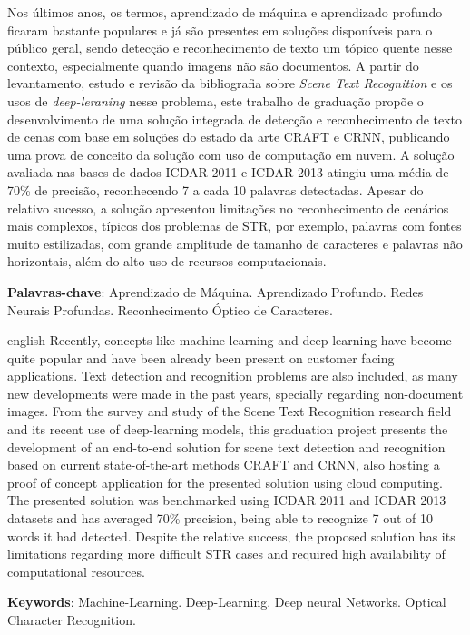 
\setlength{\absparsep}{18pt} %
\begin{resumo}
Nos últimos anos, os termos, aprendizado de máquina e aprendizado profundo ficaram bastante populares e já são 
presentes em soluções disponíveis para o público geral, sendo detecção e reconhecimento de texto um tópico 
quente nesse contexto, especialmente quando imagens não são documentos.
A partir do levantamento, estudo e revisão da bibliografia sobre \textit{Scene Text Recognition} e os usos de 
\textit{deep-leraning} nesse problema, este trabalho de graduação propõe o desenvolvimento de uma solução 
integrada de detecção e reconhecimento de texto de cenas com base em soluções do estado da arte CRAFT e CRNN, 
publicando uma prova de conceito da solução com uso de computação em nuvem.
A solução avaliada nas bases de dados ICDAR 2011 e ICDAR 2013 atingiu uma média de 70\% de precisão, reconhecendo 
7 a cada 10 palavras detectadas. Apesar do relativo sucesso, a solução apresentou limitações no reconhecimento de 
cenários mais complexos, típicos dos problemas de STR, por exemplo, palavras com fontes muito estilizadas, com grande 
amplitude de tamanho de caracteres e palavras não horizontais, além do alto uso de recursos computacionais.

 \textbf{Palavras-chave}: Aprendizado de Máquina. Aprendizado Profundo. Redes Neurais Profundas. Reconhecimento Óptico de Caracteres.
\end{resumo}

\begin{resumo}[Abstract]
 \begin{otherlanguage*}{english}
   Recently, concepts like machine-learning and deep-learning have become quite popular and have been already been 
   present on customer facing applications. Text detection and recognition problems are also included, as many new 
   developments were made in the past years, specially regarding non-document images.
   From the survey and study of the Scene Text Recognition research field and its recent use of deep-learning models, 
   this graduation project presents the development of an end-to-end solution for scene text detection and recognition 
   based on current state-of-the-art methods CRAFT and CRNN, also hosting a proof of concept application for the 
   presented solution using cloud computing. 
   The presented solution was benchmarked using ICDAR 2011 and ICDAR 2013 datasets and has averaged 70\% precision, 
   being able to recognize 7 out of 10 words it had detected. Despite the relative success, the proposed solution has 
   its limitations regarding more difficult STR cases and required high availability of computational resources.

   \vspace{\onelineskip}
 
   \noindent 
   \textbf{Keywords}: Machine-Learning. Deep-Learning. Deep neural Networks. Optical Character Recognition.
 \end{otherlanguage*}
\end{resumo}